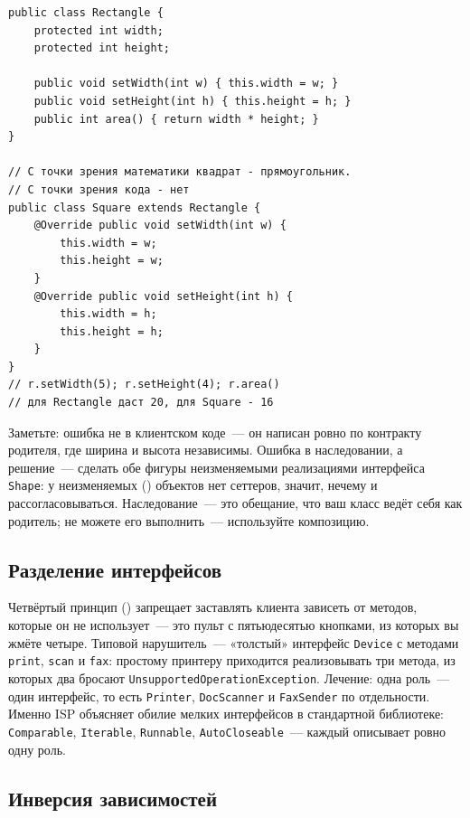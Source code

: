 \begin{listing}[H]
\begin{verbatim}
public class Rectangle {
    protected int width;
    protected int height;

    public void setWidth(int w) { this.width = w; }
    public void setHeight(int h) { this.height = h; }
    public int area() { return width * height; }
}

// С точки зрения математики квадрат - прямоугольник.
// С точки зрения кода - нет
public class Square extends Rectangle {
    @Override public void setWidth(int w) {
        this.width = w;
        this.height = w;
    }
    @Override public void setHeight(int h) {
        this.width = h;
        this.height = h;
    }
}
// r.setWidth(5); r.setHeight(4); r.area()
// для Rectangle даст 20, для Square - 16
\end{verbatim}
\caption{Квадрат, унаследованный от прямоугольника, нарушает контракт}
\label{lst:11-2}
\end{listing}

Заметьте: ошибка не в клиентском коде~--- он написан ровно по контракту
родителя, где ширина и высота независимы. Ошибка в наследовании, а решение~---
сделать обе фигуры неизменяемыми реализациями интерфейса \texttt{Shape}: у
неизменяемых () объектов нет сеттеров, значит, нечему и
рассогласовываться. Наследование~--- это обещание, что ваш класс ведёт себя как
родитель; не можете его выполнить~--- используйте композицию.

\subsection{Разделение интерфейсов}

Четвёртый принцип () запрещает
заставлять клиента зависеть от методов, которые он не использует~--- это пульт с
пятьюдесятью кнопками, из которых вы жмёте четыре. Типовой нарушитель~---
«толстый» интерфейс \texttt{Device} с методами \texttt{print}, \texttt{scan} и
\texttt{fax}: простому принтеру приходится реализовывать три метода, из которых
два бросают \texttt{UnsupportedOperationException}. Лечение: одна роль~--- один
интерфейс, то есть \texttt{Printer}, \texttt{DocScanner} и \texttt{FaxSender} по
отдельности. Именно ISP объясняет обилие мелких интерфейсов в стандартной
библиотеке: \texttt{Comparable}, \texttt{Iterable}, \texttt{Runnable},
\texttt{AutoCloseable}~--- каждый описывает ровно одну роль.

\subsection{Инверсия зависимостей}

